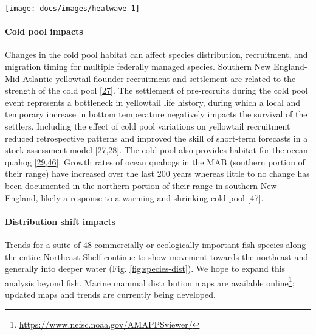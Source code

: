 \documentclass[
  10pt,
]{article}
\let\origfigure\figure
\let\endorigfigure\endfigure
\renewenvironment{figure}[1][2] {
    \expandafter\origfigure\expandafter[H]
} {
    \endorigfigure
}
\begin{document}
\begin{figure}

{\centering \texttt{[image: docs/images/heatwave-1]} 

}

\caption{Marine heatwave cumulative intesity (left) and maximum intensity (right) in the Mid-Atlantic Bight.}\label{fig:heatwave}
\end{figure}

\hypertarget{cold-pool-impacts}{%
\paragraph{Cold pool impacts}\label{cold-pool-impacts}}

Changes in the cold pool habitat can affect species distribution,
recruitment, and migration timing for multiple federally managed
species. Southern New England-Mid Atlantic yellowtail flounder
recruitment and settlement are related to the strength of the cold pool
{[}\protect\hyperlink{ref-miller_state-space_2016}{27}{]}. The
settlement of pre-recruits during the cold pool event represents a
bottleneck in yellowtail life history, during which a local and
temporary increase in bottom temperature negatively impacts the survival
of the settlers. Including the effect of cold pool variations on
yellowtail recruitment reduced retrospective patterns and improved the
skill of short-term forecasts in a stock assessment model
{[}\protect\hyperlink{ref-miller_state-space_2016}{27},\protect\hyperlink{ref-du_pontavice_incorporating_nodate}{28}{]}.
The cold pool also provides habitat for the ocean quahog
{[}\protect\hyperlink{ref-friedland_middle_2022}{29},\protect\hyperlink{ref-powell_ocean_2020}{46}{]}.
Growth rates of ocean quahogs in the MAB (southern portion of their
range) have increased over the last 200 years whereas little to no
change has been documented in the northern portion of their range in
southern New England, likely a response to a warming and shrinking cold
pool {[}\protect\hyperlink{ref-pace_two-hundred_2018}{47}{]}.

\hypertarget{distribution-shift-impacts}{%
\paragraph{Distribution shift
impacts}\label{distribution-shift-impacts}}

Trends for a suite of 48 commercially or ecologically important fish
species along the entire Northeast Shelf continue to show movement
towards the northeast and generally into deeper water (Fig.
\ref{fig:species-dist}). We hope to expand this analysis beyond fish.
Marine mammal distribution maps are available online\footnote{\url{https://www.nefsc.noaa.gov/AMAPPSviewer/}};
updated maps and trends are currently being developed.
\end{document}
